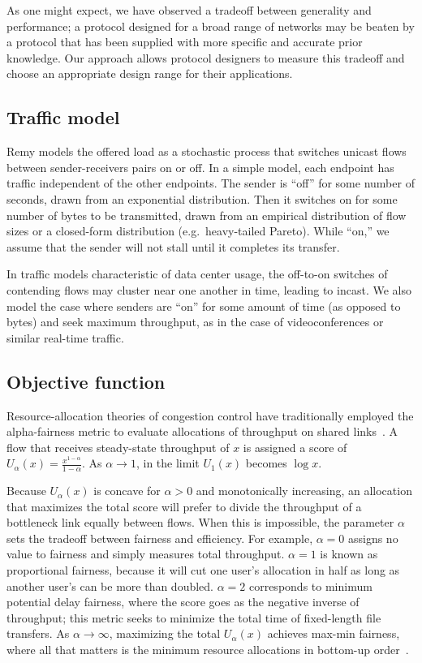 As one might expect, we have observed a tradeoff between generality
and performance; a protocol designed for a broad range of networks may
be beaten by a protocol that has been supplied with more specific and
accurate prior knowledge. Our approach allows protocol designers to
measure this tradeoff and choose an appropriate design range for their
applications.

\subsection{Traffic model}

Remy models the offered load as a stochastic process that switches
unicast flows between sender-receivers pairs on or off. In a simple
model, each endpoint has traffic independent of the other
endpoints. The sender is ``off'' for some number of seconds, drawn
from an exponential distribution. Then it switches on for some number
of bytes to be transmitted, drawn from an empirical distribution of
flow sizes or a closed-form distribution (e.g.~heavy-tailed
Pareto). While ``on,'' we assume that the sender will not stall until
it completes its transfer.

In traffic models characteristic of data center usage, the off-to-on
switches of contending flows may cluster near one another in time,
leading to incast. We also model the case where senders are ``on'' for
some amount of time (as opposed to bytes) and seek maximum throughput,
as in the case of videoconferences or similar real-time traffic.

\subsection{Objective function}

Resource-allocation theories of congestion control have traditionally
employed the alpha-fairness metric to evaluate allocations of
throughput on shared links~\cite{Srikant}. A flow that receives
steady-state throughput of $x$ is assigned a score of $U_\alpha(x) =
\frac{x^{1-\alpha}}{1-\alpha}$. As $\alpha \rightarrow 1$, in the
limit $U_1(x)$ becomes $\log x$.

Because $U_\alpha(x)$ is concave for $\alpha > 0$ and monotonically
increasing, an allocation that maximizes the total score will prefer
to divide the throughput of a bottleneck link equally between
flows. When this is impossible, the parameter $\alpha$ sets the
tradeoff between fairness and efficiency. For example, $\alpha = 0$
assigns no value to fairness and simply measures total
throughput. $\alpha = 1$ is known as proportional fairness, because it
will cut one user's allocation in half as long as another user's can
be more than doubled. $\alpha = 2$ corresponds to minimum potential
delay fairness, where the score goes as the negative inverse of
throughput; this metric seeks to minimize the total time of
fixed-length file transfers. As $\alpha \rightarrow \infty$,
maximizing the total $U_\alpha(x)$ achieves max-min fairness, where
all that matters is the minimum resource allocations in bottom-up
order~\cite{Srikant}.

